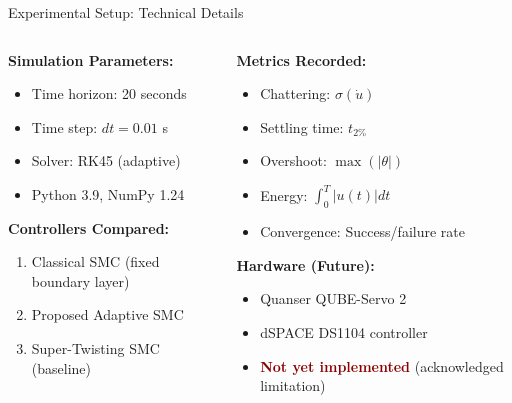 \documentclass[10pt,aspectratio=169]{beamer}
\newcommand{\emphred}[1]{\textcolor{darkred}{\textbf{#1}}}
\begin{document}
\begin{frame}{Experimental Setup: Technical Details}
\begin{columns}
\begin{column}{0.5\textwidth}
\textbf{Simulation Parameters:}
\begin{itemize}
    \item Time horizon: 20 seconds
    \item Time step: $dt = 0.01$ s
    \item Solver: RK45 (adaptive)
    \item Python 3.9, NumPy 1.24
\end{itemize}

\vspace{0.3cm}
\textbf{Controllers Compared:}
\begin{enumerate}
    \item Classical SMC (fixed boundary layer)
    \item Proposed Adaptive SMC
    \item Super-Twisting SMC (baseline)
\end{enumerate}
\end{column}
\begin{column}{0.5\textwidth}
\textbf{Metrics Recorded:}
\begin{itemize}
    \item Chattering: $\sigma(\dot{u})$
    \item Settling time: $t_{2\%}$
    \item Overshoot: $\max(|\theta|)$
    \item Energy: $\int_0^T |u(t)| dt$
    \item Convergence: Success/failure rate
\end{itemize}

\vspace{0.3cm}
\textbf{Hardware (Future):}
\begin{itemize}
    \item Quanser QUBE-Servo 2
    \item dSPACE DS1104 controller
    \item \emphred{Not yet implemented} (acknowledged limitation)
\end{itemize}
\end{column}
\end{columns}
\end{frame}
\end{document}
